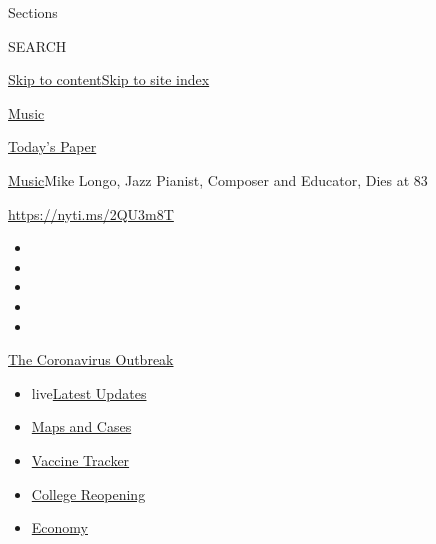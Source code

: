 Sections

SEARCH

\protect\hyperlink{site-content}{Skip to
content}\protect\hyperlink{site-index}{Skip to site index}

\href{https://www.nytimes3xbfgragh.onion/section/arts/music}{Music}

\href{https://myaccount.nytimes3xbfgragh.onion/auth/login?response_type=cookie\&client_id=vi}{}

\href{https://www.nytimes3xbfgragh.onion/section/todayspaper}{Today's
Paper}

\href{/section/arts/music}{Music}\textbar{}Mike Longo, Jazz Pianist,
Composer and Educator, Dies at 83

\url{https://nyti.ms/2QU3m8T}

\begin{itemize}
\item
\item
\item
\item
\item
\end{itemize}

\href{https://www.nytimes3xbfgragh.onion/news-event/coronavirus?action=click\&pgtype=Article\&state=default\&region=TOP_BANNER\&context=storylines_menu}{The
Coronavirus Outbreak}

\begin{itemize}
\tightlist
\item
  live\href{https://www.nytimes3xbfgragh.onion/2020/08/04/world/coronavirus-covid-19.html?action=click\&pgtype=Article\&state=default\&region=TOP_BANNER\&context=storylines_menu}{Latest
  Updates}
\item
  \href{https://www.nytimes3xbfgragh.onion/interactive/2020/us/coronavirus-us-cases.html?action=click\&pgtype=Article\&state=default\&region=TOP_BANNER\&context=storylines_menu}{Maps
  and Cases}
\item
  \href{https://www.nytimes3xbfgragh.onion/interactive/2020/science/coronavirus-vaccine-tracker.html?action=click\&pgtype=Article\&state=default\&region=TOP_BANNER\&context=storylines_menu}{Vaccine
  Tracker}
\item
  \href{https://www.nytimes3xbfgragh.onion/2020/08/02/us/covid-college-reopening.html?action=click\&pgtype=Article\&state=default\&region=TOP_BANNER\&context=storylines_menu}{College
  Reopening}
\item
  \href{https://www.nytimes3xbfgragh.onion/live/2020/08/03/business/stock-market-today-coronavirus?action=click\&pgtype=Article\&state=default\&region=TOP_BANNER\&context=storylines_menu}{Economy}
\end{itemize}

